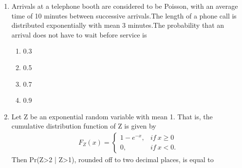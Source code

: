 %
\renewcommand{\theequation}{\theenumi}
\renewcommand{\thefigure}{\theenumi}
\renewcommand{\thetable}{\theenumi}
\begin{enumerate}[label=\thesection.\arabic*.,ref=\thesection.\theenumi]


\item Arrivals at a telephone booth are considered to be Poisson, with an average time of 10 minutes between successive arrivals.The length of a phone call is distributed exponentially with mean 3 minutes.The probability that an arrival does not have to wait before service is
\begin{enumerate}
    \item{0.3}
    \item{0.5}
    \item{0.7}
    \item{0.9}
\end{enumerate}
%
\solution

%
\item  Let Z be an exponential random variable with mean 1. That is, the cumulative distribution function of Z is given by 
\begin{align}
    F_Z(x) =
    \begin{cases}
    1 - {e^{-x}}, & if\ x \ge 0\\
    0, & if\ x<0.
    \end{cases}
\end{align}
Then Pr{(Z>2 | Z>1)}, rounded off to two decimal places, is equal to 
%
\solution



\end{enumerate}

